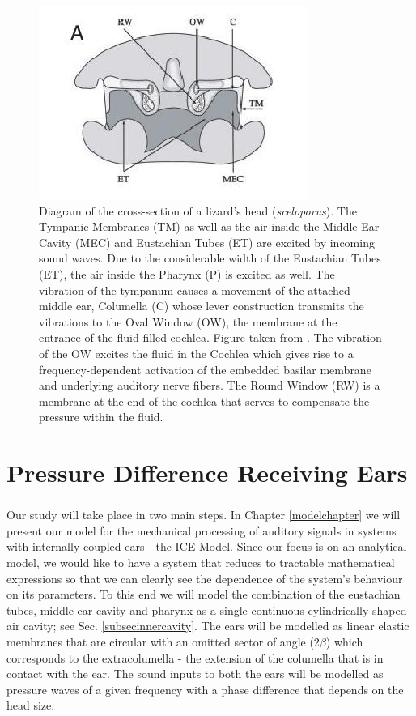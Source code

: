 \begin{figure}
 \centering
 \includegraphics[width=0.4\linewidth]{Diagrams/lizardheadcrosssection.jpeg}
 \caption[Cross Section of a Lizards Head]{Diagram of the cross-section of a lizard’s head (\textit{sceloporus}). The Tympanic Membranes (TM) as well as
 the air inside the Middle Ear Cavity (MEC) and Eustachian Tubes (ET) are excited by incoming sound waves. Due to the considerable width of the Eustachian Tubes (ET), the air inside the Pharynx (P) is excited as well.
 The vibration of the tympanum causes a movement of the attached middle ear, Columella (C) whose lever construction transmits the vibrations to the Oval Window (OW), the membrane at the entrance of the fluid filled cochlea.
 Figure taken from \cite{dalsgaardmanley1}. The vibration of the OW excites the fluid in the Cochlea which gives rise to a frequency-dependent activation of the embedded basilar membrane and underlying
 auditory nerve fibers. The Round Window (RW) is a membrane at the end of the cochlea that serves to compensate the pressure within the fluid.}
 \label{lizardheadcrosssection}
\end{figure}

\section{Pressure Difference Receiving Ears}

\subsubsection*{}
Our study will take place in two main steps. In Chapter \ref{modelchapter} we will
present our model for the mechanical processing of auditory signals in systems with internally coupled ears - the ICE Model.
Since our focus is on an analytical model, we would like to have a system that reduces to tractable mathematical expressions
so that we can clearly see the dependence of the system's behaviour on its parameters. To this end we will model the 
combination of the eustachian tubes, middle ear cavity and pharynx as a single continuous cylindrically shaped air cavity; see
Sec. \ref{subsecinnercavity}. The ears will be modelled as linear elastic membranes that are circular with an omitted sector
of angle (2$\beta$) which corresponds to the extracolumella - the extension of the columella that is in contact with the ear. The
sound inputs to both the ears will be modelled as pressure waves of a given frequency with a phase difference that depends on the 
head size.
